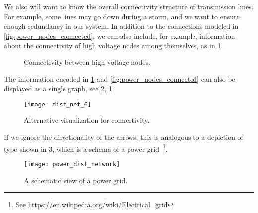We also will want to know the overall connectivity structure of transmission lines. For example, some lines may go down during a storm, and we want to ensure enough redundancy in our system. In addition to the connections modeled in \cref{fig:power_nodes_connected}, we can also include, for example, information about the connectivity of high voltage nodes among themselves, as in \cref{fig:power_internodal}.

\begin{figure}[h!]
  \centering
  \caption{Connectivity between high voltage nodes.}
  \label{fig:power_internodal}
\end{figure}
The information encoded in \cref{fig:power_internodal} and \cref{fig:power_nodes_connected} can also be displayed as a single graph, see \cref{fig:power_graph},
\cref{fig:power_internodal}.
\begin{figure}[h!]
  \centering
  \texttt{[image: dist\_net\_6]}
  \caption{Alternative visualization for connectivity.}
  \label{fig:power_graph}
\end{figure}
If we ignore the directionality of the arrows, this is analogous to a depiction of type shown in \cref{fig:power_schema}, which is a schema of a power grid~\cite{Cuffe17}\footnote{See \url{https://en.wikipedia.org/wiki/Electrical_grid}}.
\begin{figure}[h!]
  \centering
  \texttt{[image: power\_dist\_network]}
  \caption{A schematic view of a power grid.}
  \label{fig:power_schema}
\end{figure}
